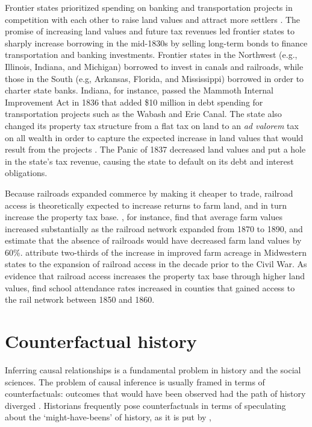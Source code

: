 Frontier states prioritized spending on banking and transportation projects in competition with each other to raise land values and attract more settlers \citep{sylla1998anatomy}. The promise of increasing land values and future tax revenues led frontier states to sharply increase borrowing in the mid-1830s by selling long-term bonds to finance transportation and banking investments. Frontier states in the Northwest (e.g., Illinois, Indiana, and Michigan) borrowed to invest in canals and railroads, while those in the South (e.g, Arkansas, Florida, and Mississippi) borrowed in order to charter state banks. Indiana, for instance, passed the Mammoth Internal Improvement Act in 1836 that added \$10 million in debt spending for transportation projects such as the Wabash and Erie Canal. The state also changed its property tax structure from a flat tax on land to an \emph{ad valorem} tax on all wealth in order to capture the expected increase in land values that would result from the projects \citep{wallis2004sovereign}. The Panic of 1837 decreased land values and put a hole in the state's tax revenue, causing the state to default on its debt and interest obligations.

Because railroads expanded commerce by making it cheaper to trade, railroad access is theoretically expected to increase returns to farm land, and in turn increase the property tax base. \citet{donaldson2016railroads}, for instance, find that average farm values increased substantially as the railroad network expanded from 1870 to 1890, and estimate that the absence of railroads would have decreased farm land values by 60\%. \citet{atack2011impact} attribute two-thirds of the increase in improved farm acreage in Midwestern states to the expansion of railroad access in the decade prior to the Civil War. As evidence that railroad access increases the property tax base through higher land values, \citet{atack2012impact} find school attendance rates increased in counties that gained access to the rail network between 1850 and 1860. 

\section{Counterfactual history}

Inferring causal relationships is a fundamental problem in history and the social sciences. The problem of causal inference is usually framed in terms of counterfactuals: outcomes that would have been observed had the path of history diverged \citep{lewis2013counterfactuals,pearl2009causality,imbens2015causal}. Historians frequently pose counterfactuals in terms of speculating about the `might-have-beens' of history, as it is put by  \citet{elster1978logic}, 

